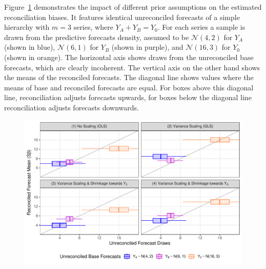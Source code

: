 \documentclass[a4paper,fleqn,11pt]{article}
\begin{document}
Figure~\ref{fig:weights} demonstrates the impact of different prior assumptions on the estimated reconciliation biases. It features identical unreconciled forecasts of a simple hierarchy with $m=3$ series, where $Y_A + Y_B = Y_0$. For each series a sample is drawn from the predictive forecasts density, assumed to be $\mathcal{N}(4,2)$ for $Y_A$ (shown in blue), $\mathcal{N}(6,1)$ for $Y_B$ (shown in purple), and $\mathcal{N}(16,3)$ for $Y_0$ (shown in orange). The horizontal axis shows draws from the unreconciled base forecasts, which are clearly incoherent. The vertical axis on the other hand shows the means of the reconciled forecasts. The diagonal line shows values where the means of base and reconciled forecasts are equal. For boxes above this diagonal line, reconciliation adjusts forecasts upwards, for boxes below the diagonal line reconciliation adjusts forecasts downwards.
\begin{figure}[H]
	\includegraphics[width=\textwidth]{fig/fig_biases}
	\label{fig:weights}
\end{figure}
\end{document}
